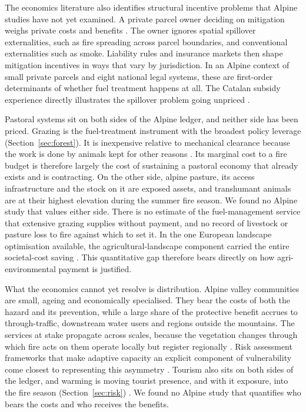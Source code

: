 \documentclass[11pt,a4paper]{article}
\begin{document}
The economics literature also identifies structural incentive problems that Alpine studies have not yet examined. A private parcel owner deciding on mitigation weighs private costs and benefits \citep{bayham_economics_2022}. The owner ignores spatial spillover externalities, such as fire spreading across parcel boundaries, and conventional externalities such as smoke. Liability rules and insurance markets then shape mitigation incentives in ways that vary by jurisdiction. In an Alpine context of small private parcels and eight national legal systems, these are first-order determinants of whether fuel treatment happens at all. The Catalan subsidy experience directly illustrates the spillover problem going unpriced \citep{gorrizmifsud_current_2026}.

Pastoral systems sit on both sides of the Alpine ledger, and neither side has been priced. Grazing is the fuel-treatment instrument with the broadest policy leverage (Section~\ref{sec:forest}). It is inexpensive relative to mechanical clearance because the work is done by animals kept for other reasons \citep{xu_how_2026}. Its marginal cost to a fire budget is therefore largely the cost of sustaining a pastoral economy that already exists and is contracting. On the other side, alpine pasture, its access infrastructure and the stock on it are exposed assets, and transhumant animals are at their highest elevation during the summer fire season. We found no Alpine study that values either side. There is no estimate of the fuel-management service that extensive grazing supplies without payment, and no record of livestock or pasture loss to fire against which to set it. In the one European landscape optimisation available, the agricultural-landscape component carried the entire societal-cost saving \citep{lecinadiaz_incorporating_2023}. This quantitative gap therefore bears directly on how agri-environmental payment is justified.

What the economics cannot yet resolve is distribution. Alpine valley communities are small, ageing and economically specialised. They bear the costs of both the hazard and its prevention, while a large share of the protective benefit accrues to through-traffic, downstream water users and regions outside the mountains. The services at stake propagate across scales, because the vegetation changes through which fire acts on them operate locally but register regionally \citep{vukomanovic_systematic_2019}. Risk assessment frameworks that make adaptive capacity an explicit component of vulnerability come closest to representing this asymmetry \citep{riviere_mapping_2023, lecinadiaz_assessing_2021}. Tourism also sits on both sides of the ledger, and warming is moving tourist presence, and with it exposure, into the fire season (Section~\ref{sec:risk}) \citep{pede_mountain_2022, abrham_wildfires_2024}. We found no Alpine study that quantifies who bears the costs and who receives the benefits.
\end{document}
